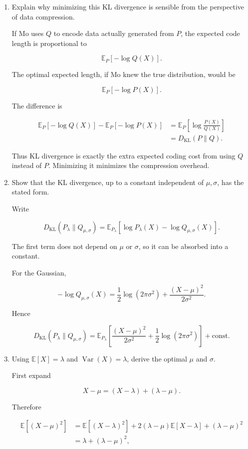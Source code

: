 \documentclass[11pt]{article}
\newcommand{\E}{\mathbb{E}}
\newcommand{\Var}{\operatorname{Var}}
\newcommand{\KL}{D_{\mathrm{KL}}}
\begin{document}
\begin{enumerate}

\item Explain why minimizing this KL divergence is sensible from the
perspective of data compression.

If Mo uses \(Q\) to encode data actually generated from \(P\), the expected
code length is proportional to

\[
\E_P[-\log Q(X)].
\]

The optimal expected length, if Mo knew the true distribution, would be

\[
\E_P[-\log P(X)].
\]

The difference is

\begin{align*}
\E_P[-\log Q(X)]
-
\E_P[-\log P(X)]
&=
\E_P\left[
\log\frac{P(X)}{Q(X)}
\right] \\
&=
\KL(P\|Q).
\end{align*}

Thus KL divergence is exactly the extra expected coding cost from using
\(Q\) instead of \(P\). Minimizing it minimizes the compression overhead.

\item Show that the KL divergence, up to a constant independent of
\(\mu,\sigma\), has the stated form.

Write

\[
\KL(P_\lambda\|Q_{\mu,\sigma})
=
\E_{P_\lambda}
\left[
\log P_\lambda(X)
-
\log Q_{\mu,\sigma}(X)
\right].
\]

The first term does not depend on \(\mu\) or \(\sigma\), so it can be absorbed
into a constant.

For the Gaussian,

\[
-\log Q_{\mu,\sigma}(X)
=
\frac12\log(2\pi\sigma^2)
+
\frac{(X-\mu)^2}{2\sigma^2}.
\]

Hence

\[
\KL(P_\lambda\|Q_{\mu,\sigma})
=
\E_{P_\lambda}
\left[
\frac{(X-\mu)^2}{2\sigma^2}
+
\frac12\log(2\pi\sigma^2)
\right]
+\text{const.}
\]

\item Using \(\E[X]=\lambda\) and \(\Var(X)=\lambda\), derive the optimal
\(\mu\) and \(\sigma\).

First expand

\[
X-\mu
=
(X-\lambda)+(\lambda-\mu).
\]

Therefore

\begin{align*}
\E[(X-\mu)^2]
&=
\E[(X-\lambda)^2]
+2(\lambda-\mu)\E[X-\lambda]
+(\lambda-\mu)^2 \\
&=
\lambda+(\lambda-\mu)^2,
\end{align*}


\end{enumerate}
\end{document}
